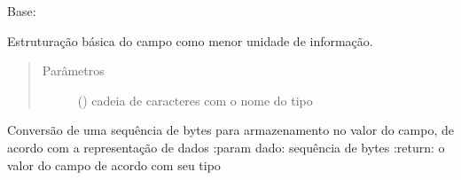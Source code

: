 \documentclass[letterpaper,10pt,brazil]{sphinxmanual}
\begin{document}
\begin{fulllineitems}
\label{\detokenize{estrutarq.campo:estrutarq.campo.campo_comum.CampoBasico}}
\pysigstartsignatures
{}
\pysigstopsignatures
\sphinxAtStartPar
Base: {\hyperref[\detokenize{estrutarq.dado:estrutarq.dado.DadoBasico}]{}}

\sphinxAtStartPar
Estruturação básica do campo como menor unidade de informação.
\begin{quote}\begin{description}
\item[{Parâmetros}] \leavevmode
\sphinxAtStartPar
{} () \textendash{} cadeia de caracteres com o nome do tipo

\end{description}\end{quote}

\begin{fulllineitems}
\label{\detokenize{estrutarq.campo:estrutarq.campo.campo_comum.CampoBasico.bytes_para_valor}}
\pysigstartsignatures
{}
\pysigstopsignatures
\sphinxAtStartPar
Conversão de uma sequência de bytes para armazenamento no valor
do campo, de acordo com a representação de dados
:param dado: sequência de bytes
:return: o valor do campo de acordo com seu tipo

\end{fulllineitems}



\end{fulllineitems}
\end{document}
